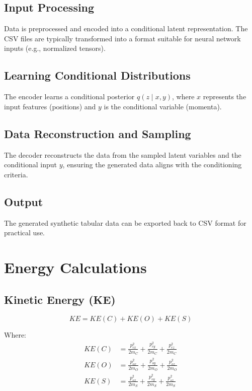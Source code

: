 \documentclass[a4paper,10pt]{article}
\begin{document}
\subsection{Input Processing}
Data is preprocessed and encoded into a conditional latent representation. The CSV files are typically transformed into a format suitable for neural network inputs (e.g., normalized tensors).

\subsection{Learning Conditional Distributions}
The encoder learns a conditional posterior \( q(z \mid x, y) \), where \( x \) represents the input features (positions) and \( y \) is the conditional variable (momenta).

\subsection{Data Reconstruction and Sampling}
The decoder reconstructs the data from the sampled latent variables and the conditional input \( y \), ensuring the generated data aligns with the conditioning criteria.

\subsection{Output}
The generated synthetic tabular data can be exported back to CSV format for practical use.

\section{Energy Calculations}

\subsection{Kinetic Energy (KE)}
\begin{equation}
KE = KE(C) + KE(O) + KE(S)
\end{equation}

Where:
\begin{align}
KE(C) &= \frac{p_{cx}^2}{2m_C} + \frac{p_{cy}^2}{2m_C} + \frac{p_{cz}^2}{2m_C} \\
KE(O) &= \frac{p_{ox}^2}{2m_O} + \frac{p_{oy}^2}{2m_O} + \frac{p_{oz}^2}{2m_O} \\
KE(S) &= \frac{p_{sx}^2}{2m_S} + \frac{p_{sy}^2}{2m_S} + \frac{p_{sz}^2}{2m_S}
\end{align}
\end{document}
